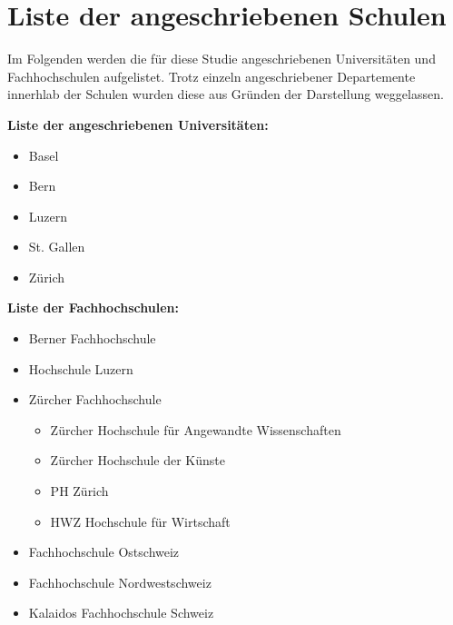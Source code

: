 %
%
\glsresetall

\let\raggedsection\centering 
\chapter{Liste der angeschriebenen Schulen}\label{chap.appendix_schulListe}
\let\raggedsection\raggedright 
\begin{RaggedRight}
Im Folgenden werden die für diese Studie angeschriebenen Universitäten und Fachhochschulen aufgelistet. Trotz einzeln angeschriebener Departemente innerhlab der Schulen wurden diese aus Gründen der Darstellung weggelassen.\par
\textbf{Liste der angeschriebenen Universitäten:}
\begin{itemize}
    \item Basel
    \item Bern
    \item Luzern
    \item St. Gallen
    \item Zürich
\end{itemize}
\textbf{Liste der Fachhochschulen:}
\begin{itemize}
    \item Berner Fachhochschule
    \item Hochschule Luzern
    \item Zürcher Fachhochschule
    \begin{itemize}
        \item Zürcher Hochschule für Angewandte Wissenschaften
        \item Zürcher Hochschule der Künste
        \item PH Zürich
        \item HWZ Hochschule für Wirtschaft
    \end{itemize}
    \item Fachhochschule Ostschweiz
    \item Fachhochschule Nordwestschweiz 
    \item Kalaidos Fachhochschule Schweiz
\end{itemize}

\end{RaggedRight}
